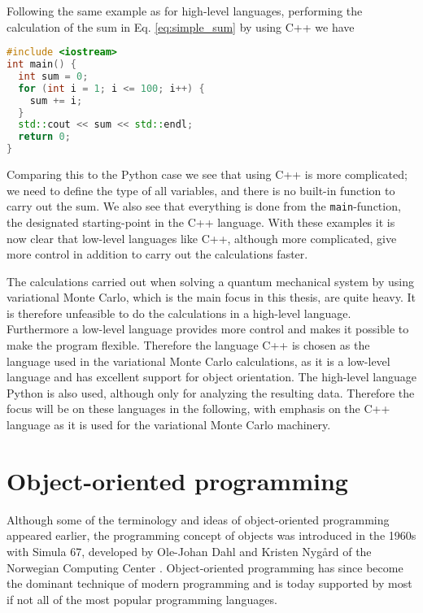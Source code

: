 		Following the same example as for high-level languages, performing the calculation of the sum in Eq. \eqref{eq:simple_sum} by using C++ we have
\begin{lstlisting}[language=C++, firstnumber=1, framesep=0pt]
#include <iostream>
int main() {
  int sum = 0;
  for (int i = 1; i <= 100; i++) {
    sum += i;
  }
  std::cout << sum << std::endl;
  return 0;
}
\end{lstlisting}
		Comparing this to the Python case we see that using
                C++ is more complicated; we need to define the type of
                all variables, and there is no built-in function to
                carry out the sum. We also see that everything is
                done from the {\tt main}-function, the designated
                starting-point in the C++ language. With these
                examples it is now clear that low-level languages like
                C++, although more complicated, give more control in
                addition to carry out the calculations faster.

		The calculations carried out when solving a quantum
                mechanical system by using variational Monte Carlo,
                which is the main focus in this thesis, are quite
                heavy. It is therefore unfeasible to do the
                calculations in a high-level language. Furthermore a
                low-level language provides more control and makes it
                possible to make the program flexible. Therefore the
                language C++ is chosen as the language used in the
                variational Monte Carlo calculations, as it is a
                low-level language and has excellent support for
                object orientation. The high-level language Python is
                also used, although only for analyzing the resulting
                data. Therefore the focus will be on these languages
                in the following, with emphasis on the C++ language as
                it is used for the variational Monte Carlo machinery.


\section{Object-oriented programming}
	Although some of the terminology and ideas of object-oriented programming appeared earlier, the programming concept of objects was introduced in the 1960s with Simula 67, developed by Ole-Johan Dahl and Kristen Nygård of the Norwegian Computing Center \cite{holmevik94}. Object-oriented programming has since become the dominant technique of modern programming and is today supported by most if not all of the most popular programming languages.

